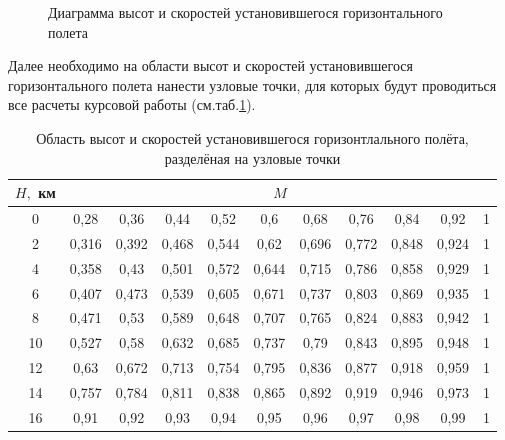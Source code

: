 \begin{figure}[H]
    \caption{Диаграмма высот и скоростей установившегося горизонтального полета}
    \label{fig:Область}
\end{figure}

Далее необходимо на области высот и скоростей установившегося горизонтального полета нанести узловые точки, для которых будут проводиться все расчеты курсовой работы (см.таб.\ref{tab:Узловые точки}).

     \begin{table}[H]
    \centering
    \caption{Область высот и скоростей установившегося горизонтлального полёта, разделёная на узловые точки}
    \label{tab:Узловые точки}
    \begin{tabular}{|c|c|c|c|c|c|c|c|c|c|c|}
    \hline
        $H,$ км &\multicolumn{10}{|c|}{$M$} \\ \hline
        0 & 0,28 & 0,36 & 0,44 & 0,52 & 0,6 & 0,68 & 0,76 & 0,84 & 0,92 & 1  \\ \hline
        2 & 0,316 & 0,392 & 0,468 & 0,544 & 0,62 & 0,696 & 0,772 & 0,848 & 0,924 & 1  \\ \hline
        4 & 0,358 & 0,43 & 0,501 & 0,572 & 0,644 & 0,715 & 0,786 & 0,858 & 0,929 & 1  \\ \hline
        6 & 0,407 & 0,473 & 0,539 & 0,605 & 0,671 & 0,737 & 0,803 & 0,869 & 0,935 & 1  \\ \hline
        8 & 0,471 & 0,53 & 0,589 & 0,648 & 0,707 & 0,765 & 0,824 & 0,883 & 0,942 & 1  \\ \hline
        10 & 0,527 & 0,58 & 0,632 & 0,685 & 0,737 & 0,79 & 0,843 & 0,895 & 0,948 & 1  \\ \hline
        12 & 0,63 & 0,672 & 0,713 & 0,754 & 0,795 & 0,836 & 0,877 & 0,918 & 0,959 & 1  \\ \hline
        14 & 0,757 & 0,784 & 0,811 & 0,838 & 0,865 & 0,892 & 0,919 & 0,946 & 0,973 & 1  \\ \hline
        16 & 0,91 & 0,92 & 0,93 & 0,94 & 0,95 & 0,96 & 0,97 & 0,98 & 0,99 & 1  \\ \hline
    \end{tabular}
\end{table}

